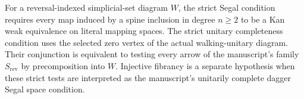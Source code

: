 \begin{resultblock}
\begin{proposition}
\label{catalogue:B4}
For a reversal-indexed simplicial-set diagram $W$, the strict Segal condition requires every map induced by a spine inclusion in degree $n\geq2$ to be a Kan weak equivalence on literal mapping spaces.
The strict unitary completeness condition uses the selected zero vertex of the actual walking-unitary diagram.
Their conjunction is equivalent to testing every arrow of the manuscript's family $S_{\mathrm{rev}}$ by precomposition into $W$.
Injective fibrancy is a separate hypothesis when these strict tests are interpreted as the manuscript's unitarily complete dagger Segal space condition.
\end{proposition}

\end{resultblock}

